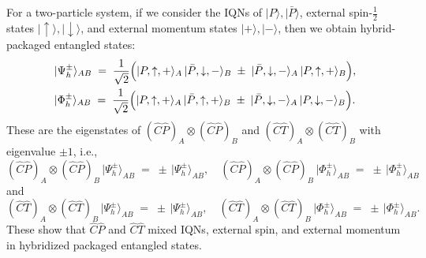 \documentclass[12pt,a4paper]{article}
\begin{document}
For a two-particle system, if we consider the IQNs of $\lvert P\rangle, \lvert\bar{P}\rangle$, external spin-$\tfrac12$ states $\lvert \uparrow\rangle, \lvert\downarrow\rangle$, and external momentum states $\lvert+\rangle, \lvert-\rangle$, then we obtain hybrid-packaged entangled states:
\begin{align}\label{EQ:HybridPES}
	\begin{aligned}
		&\lvert \Psi_h^{\pm} \rangle_{AB}
		\;=\;
		\frac{1}{\sqrt{2}}
		\Bigl(
		\lvert P, \uparrow, +\rangle_A \,\lvert \bar{P}, \downarrow, -\rangle_B
		\;\pm\;
		\lvert \bar{P}, \downarrow, -\rangle_A \,\lvert P, \uparrow, +\rangle_B
		\Bigr), \\
		&\lvert \Phi_h^{\pm} \rangle_{AB}
		\;=\;
		\frac{1}{\sqrt{2}}
		\Bigl(
		\lvert P, \uparrow, +\rangle_A \,\lvert \bar{P}, \uparrow, +\rangle_B
		\;\pm\;
		\lvert \bar{P}, \downarrow, -\rangle_A \,\lvert P, \downarrow, -\rangle_B
		\Bigr).
	\end{aligned}
\end{align}
These are the eigenstates of $(\hat{C}\hat{P})_A \otimes (\hat{C}\hat{P})_B$ and $(\hat{C}\hat{T})_A \otimes (\hat{C}\hat{T})_B$ with eigenvalue $\pm 1$, i.e.,
\[
(\hat{C}\hat{P})_A \otimes (\hat{C}\hat{P})_B \,\lvert \Psi_h^{\pm} \rangle_{AB}
\;=\;
\pm\,\lvert \Psi_h^{\pm} \rangle_{AB},
\quad
(\hat{C}\hat{P})_A \otimes (\hat{C}\hat{P})_B \,\lvert \Phi_h^{\pm} \rangle_{AB}
\;=\;
\pm\,\lvert \Phi_h^{\pm} \rangle_{AB}
\]
and
\[
(\hat{C}\hat{T})_A \otimes (\hat{C}\hat{T})_B \,\lvert \Psi_h^{\pm} \rangle_{AB}
\;=\;
\pm\,\lvert \Psi_h^{\pm} \rangle_{AB},
\quad
(\hat{C}\hat{T})_A \otimes (\hat{C}\hat{T})_B \,\lvert \Phi_h^{\pm} \rangle_{AB}
\;=\;
\pm\,\lvert \Phi_h^{\pm} \rangle_{AB}.
\]
These show that $\hat{C}\hat{P}$ and $\hat{C}\hat{T}$ mixed IQNs, external spin, and external momentum in hybridized packaged entangled states.
\end{document}

